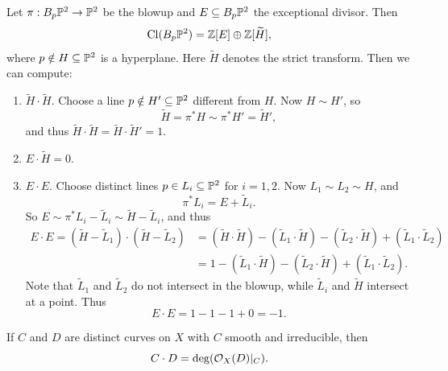 \begin{example}
  Let
  $\pi : B_p \mathbb{P}^2 \to \mathbb{P}^2$ be the
  blowup and
  $E \subseteq B_p \mathbb{P}^2$ the
  exceptional divisor. Then
  \[
    \operatorname{Cl}(B_p \mathbb{P}^2)
    = \mathbb{Z}[E] \oplus \mathbb{Z}[\widetilde{H}],
  \]
  where $p \notin H \subseteq \mathbb{P}^2$ is a
  hyperplane. Here $\widetilde{H}$ denotes
  the strict transform. Then we can compute:
  \begin{enumerate}
    \item $\widetilde{H} \cdot \widetilde{H}$. Choose
      a line $p \notin H' \subseteq \mathbb{P}^2$
      different from $H$. Now
      $H \sim H'$, so
      \[
        \widetilde{H}
        = \pi^* H
        \sim \pi^* H'
        = \widetilde{H}',
      \]
      and thus $\widetilde{H} \cdot \widetilde{H} = \widetilde{H} \cdot \widetilde{H}' = 1$.
    \item $E \cdot \widetilde{H} = 0$.
    \item $E \cdot E$. Choose distinct
      lines $p \in L_i \subseteq \mathbb{P}^2$ for
      $i = 1, 2$. Now
      $L_1 \sim L_2 \sim H$, and
      \[
        \pi^* L_i
        = E + \widetilde{L}_i.
      \]
      So
      $E \sim \pi^* L_i - \widetilde{L}_i \sim \widetilde{H} - \widetilde{L}_i$,
      and thus
      \begin{align*}
        E \cdot E
        = (\widetilde{H} - \widetilde{L}_1)
        \cdot (\widetilde{H} - \widetilde{L}_2)
        &= (\widetilde{H} \cdot \widetilde{H})
        - (\widetilde{L}_1 \cdot \widetilde{H})
        - (\widetilde{L}_2 \cdot \widetilde{H})
        + (\widetilde{L}_1 \cdot \widetilde{L}_2) \\
        &= 1
        - (\widetilde{L}_1 \cdot \widetilde{H})
        - (\widetilde{L}_2 \cdot \widetilde{H})
        + (\widetilde{L}_1 \cdot \widetilde{L}_2).
      \end{align*}
      Note that $\widetilde{L}_1$ and
      $\widetilde{L}_2$ do not intersect in
      the blowup, while
      $\widetilde{L}_i$ and $\widetilde{H}$
      intersect at a point. Thus
      \[
        E \cdot E
        = 1 - 1 - 1 + 0 = -1.
      \]
  \end{enumerate}
\end{example}

\begin{lemma}
  If $C$ and $D$ are distinct curves
  on $X$ with $C$ smooth and irreducible, then
  \[
    C \cdot D
    = \deg(\mathcal{O}_X(D)|_C).
  \]
\end{lemma}


